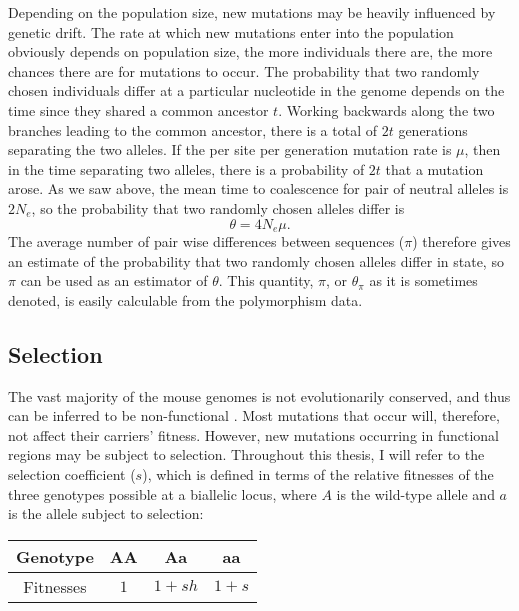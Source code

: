 	Depending on the population size, new mutations may be heavily influenced by genetic drift. The rate at which new mutations enter into the population obviously depends on population size, the more individuals there are, the more chances there are for mutations to occur. The probability that two randomly chosen individuals differ at a particular nucleotide in the genome depends on the time since they shared a common ancestor $t$. Working backwards along the two branches leading to the common ancestor, there is a total of $2t$ generations separating the two alleles. If the per site per generation mutation rate is $\mu$, then in the time separating two alleles, there is a probability of $2t$ that a mutation arose. As we saw above, the mean time to coalescence for pair of neutral alleles is $2N_e$, so the probability that two randomly chosen alleles differ is
	\begin{equation}
	\theta = 4N_e\mu. 		
	\end{equation}
\noindent
The average number of pair wise differences between sequences ($\pi$) therefore gives an estimate of the probability that two randomly chosen alleles differ in state, so $\pi$ can be used as an estimator of $\theta$. This quantity, $\pi$, or $\theta_{\pi}$ as it is sometimes denoted, is easily calculable from the polymorphism data. 


\subsection{Selection}

	The vast majority of the mouse genomes is not evolutionarily conserved, and thus can be inferred to be non-functional \citep{RN161}. Most mutations that occur will, therefore, not affect  their carriers' fitness. However, new mutations occurring in functional regions may be subject to selection. Throughout this thesis, I will refer to the selection coefficient ($s$), which is defined in terms of the relative fitnesses of the three genotypes possible at a biallelic locus, where $A$ is the wild-type allele and $a$ is the allele subject to selection:

\begin{center}
\begin{tabular}{c | c | c | c }
	Genotype & AA & Aa & aa \\ \hline
	Fitnesses& $1$ & $1 + sh$ & $1 + s$ \\
\end{tabular}
\end{center}	

